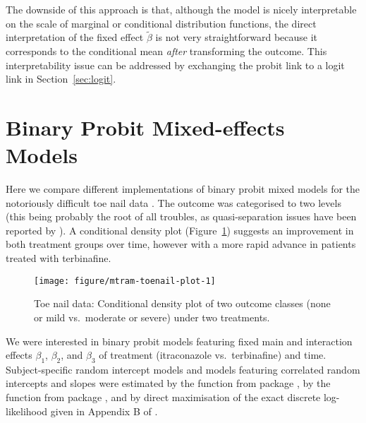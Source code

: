 \documentclass[article,nojss,shortnames]{jss}\usepackage[]{graphicx}\usepackage[]{xcolor}
\newcommand{\eshiftparm}{\beta}
\begin{document}
The downside of this approach is that, although the model is nicely
interpretable on the scale of marginal or conditional distribution
functions, the direct interpretation of the fixed effect $\tilde{\beta}$ is
not very straightforward because it corresponds to the conditional mean
\emph{after} transforming the outcome.  This interpretability issue can be
addressed by exchanging the probit link to a logit link in
Section~\ref{sec:logit}.

\section{Binary Probit Mixed-effects Models}

Here we compare different implementations of binary probit mixed models for
the notoriously difficult toe nail data \citep{backer_vroey_1998}. The
outcome was categorised to two levels (this being probably the root of all
troubles, as quasi-separation issues have been
reported by \cite{Sauter_Held_2016}).
A conditional density plot (Figure~\ref{fig:toenail}) suggests
an improvement in both treatment groups over time, however with a more rapid
advance in patients treated with terbinafine.

\begin{figure}[t]
\begin{Schunk}


{\centering \texttt{[image: figure/mtram-toenail-plot-1]} 

}

\end{Schunk}
\caption{Toe nail data: Conditional density plot of two outcome classes
(none or mild vs.~moderate or severe) under two treatments.
\label{fig:toenail}}
\end{figure}

We were interested in binary probit models featuring fixed main and
interaction effects $\eshiftparm_1$, $\eshiftparm_2$, and $\eshiftparm_3$ of
treatment (itraconazole vs.~terbinafine) and time.  Subject-specific random
intercept models and models featuring correlated random intercepts and
slopes were estimated by the  function from package
 \citep{pkg:lme4}, by the  function from package
 \citep{ogden_2015}, and by direct maximisation of the exact
discrete log-likelihood given in Appendix B of \cite{Hothorn_2019_mtram}.
\end{document}
